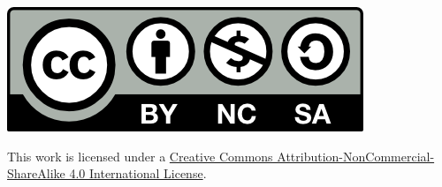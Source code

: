 \begin{titlepage}
\begin{addmargin}[-1cm]{-3cm}
\begin{center}
\vspace{2cm}

\begin{minipage}{0.28\linewidth}
	\includegraphics[width=\textwidth]{Figures/Art/by-nc-sa.png}
\end{minipage}
\hfill
\begin{minipage}{0.7\linewidth}
This work is licensed under a \href{http://creativecommons.org/licenses/by-nc-sa/4.0/}{Creative Commons Attribution-NonCommercial-ShareAlike 4.0 International License}.
\end{minipage}


\end{center}
\end{addmargin}

\end{titlepage}




